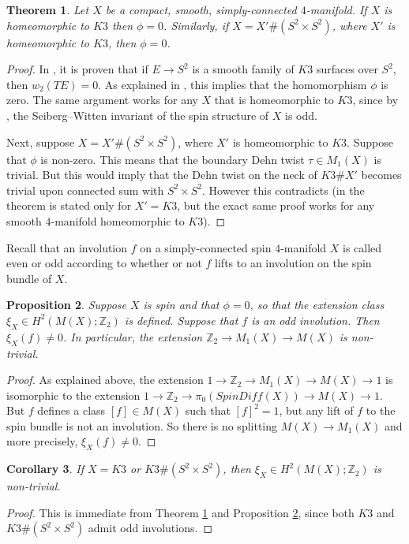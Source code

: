 \documentclass{amsart}
\newtheorem{theorem}{Theorem}[section]
\newtheorem{corollary}[theorem]{Corollary}
\newtheorem{proposition}[theorem]{Proposition}
\theoremstyle{definition}
\theoremstyle{remark}
\numberwithin{equation}{section}
\begin{document}
\begin{theorem}\label{thm:phi}
Let $X$ be a compact, smooth, simply-connected $4$-manifold. If $X$ is homeomorphic to $K3$ then $\phi = 0$. Similarly, if $X = X' \# (S^2 \times S^2)$, where $X'$ is homeomorphic to $K3$, then $\phi = 0$.
\end{theorem}
\begin{proof}
In \cite{bk2}, it is proven that if $E \to S^2$ is a smooth family of $K3$ surfaces over $S^2$, then $w_2(TE) = 0$. As explained in \cite{km}, this implies that the homomorphism $\phi$ is zero. The same argument works for any $X$ that is homeomorphic to $K3$, since by \cite{ms}, the Seiberg--Witten invariant of the spin structure of $X$ is odd.

Next, suppose $X = X' \# (S^2 \times S^2)$, where $X'$ is homeomorphic to $K3$. Suppose that $\phi$ is non-zero. This means that the boundary Dehn twist $\tau \in M_1(X)$ is trivial. But this would imply that the Dehn twist on the neck of $K3 \# X'$ becomes trivial upon connected sum with $S^2 \times S^2$. However this contradicts \cite{lin} (in \cite{lin} the theorem is stated only for $X' = K3$, but the exact same proof works for any smooth $4$-manifold homeomorphic to $K3$).
\end{proof}

Recall that an involution $f$ on a simply-connected spin $4$-manifold $X$ is called even or odd according to whether or not $f$ lifts to an involution on the spin bundle of $X$.

\begin{proposition}\label{prop:odd}
Suppose $X$ is spin and that $\phi = 0$, so that the extension class $\xi_X \in H^2(M(X) ; \mathbb{Z}_2)$ is defined. Suppose that $f$ is an odd involution. Then $\xi_X(f) \neq 0$. In particular, the extension $\mathbb{Z}_2 \to M_1(X) \to M(X)$ is non-trivial.
\end{proposition}
\begin{proof}
As explained above, the extension $1 \to \mathbb{Z}_2 \to M_1(X) \to M(X) \to 1$ is isomorphic to the extension $1 \to \mathbb{Z}_2 \to \pi_0(SpinDiff(X) ) \to M(X) \to 1$. But $f$ defines a class $[f] \in M(X)$ such that $[f]^2 = 1$, but any lift of $f$ to the spin bundle is not an involution. So there is no splitting $M(X) \to M_1(X)$ and more precisely, $\xi_X(f) \neq 0$.
\end{proof}

\begin{corollary}
If $X = K3$ or $K3 \# (S^2 \times S^2)$, then $\xi_X \in H^2( M(X) ; \mathbb{Z}_2)$ is non-trivial.
\end{corollary}
\begin{proof}
This is immediate from Theorem \ref{thm:phi} and Proposition \ref{prop:odd}, since both $K3$ and $K3 \# (S^2 \times S^2)$ admit odd involutions.
\end{proof}
\end{document}
